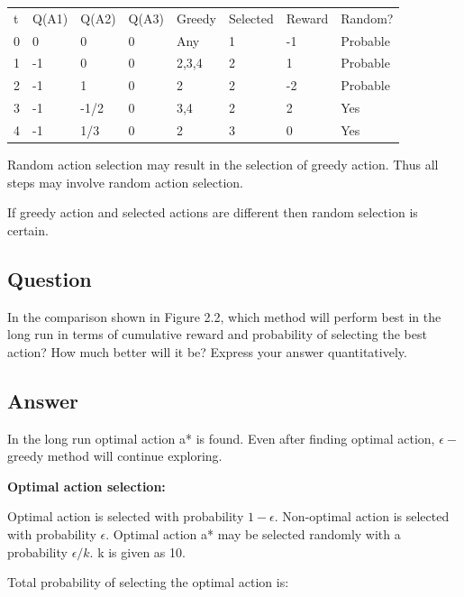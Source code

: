 \documentclass{article}
\begin{document}
    \begin{table}[]
        \begin{tabular}{llllllll}
            t & Q(A1) & Q(A2) & Q(A3) & Greedy & Selected & Reward & Random?  \\
            0 & 0     & 0     & 0     & Any    & 1        & -1     & Probable \\
            1 & -1    & 0     & 0     & 2,3,4  & 2        & 1      & Probable \\
            2 & -1    & 1     & 0     & 2      & 2        & -2     & Probable \\
            3 & -1    & -1/2  & 0     & 3,4    & 2        & 2      & Yes      \\
            4 & -1    & 1/3   & 0     & 2      & 3        & 0      & Yes      \\
        \end{tabular}
    \end{table}

    Random action selection may result in the selection of greedy action.
    Thus all steps may involve random action selection.

    If greedy action and selected actions are different then random selection is certain.

    \subsection{Question}

    In the comparison shown in Figure 2.2, which method will perform best in the long run in
    terms of cumulative reward and probability of selecting the best action? How much better will it be?
    Express your answer quantitatively.

    \subsection*{Answer}

    In the long run optimal action a* is found.
    Even after finding optimal action, $\epsilon-$greedy method will continue exploring.

    \textbf{Optimal action selection:}

    Optimal action is selected with probability $1-\epsilon$.
    Non-optimal action is selected with probability $\epsilon$.
    Optimal action a* may be selected randomly with a probability $\epsilon/k$.
    k is given as 10.

    Total probability of selecting the optimal action is:
\end{document}
